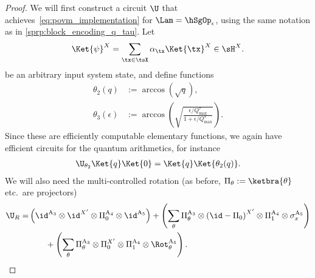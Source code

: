\begin{proof}
  We will first construct a circuit $\U$ that achieves~\cref{eq:povm_implementation} for $\Lam=\hSgOp_\epsilon$, using the same notation as in \cref{sprp:block_encoding_q_tau}. Let
  \begin{equation}
    \label{eq:psi}
    \Ket{\psi}^X=\sum_{\tx\in\tsX}\alpha_{\tx}\Ket{\tx}^X\in\sH^X.
  \end{equation}
  be an arbitrary input system state, and define functions
  \begin{align}
    \theta_2\left(q\right)&:=\arccos\left(\sqrt{q}\right),\\
    \theta_3\left(\epsilon\right)&:=\arccos\left(\sqrt{\frac{\epsilon/Q_{\max}^{\tau}}{1+\epsilon/Q_{\max}^{\tau}}}\right).
  \end{align}
  Since these are efficiently computable elementary functions, we again have efficient circuits for the quantum arithmetics, for instance
  \begin{align}
    \label{eq:U_theta_2}
    \U_{\theta_2}\Ket{q}\Ket{0} = \Ket{q}\Ket{\theta_2(q)}.
  \end{align}
  We will also need the multi-controlled rotation (as before, $\Pi_\theta:=\ketbra{\theta}$ etc.\ are projectors)
  \begin{align}
    \label{eq:controlled_rotation_sigma_lambda}
    \U_R=&\left(\id^{\text{A}_3}\otimes\id^{X'}\otimes\Pi_0^{\text{A}_4}\otimes\id^{\text{A}_5}\right)   +  
        \left(\sum_{\theta}\Pi_{\theta}^{\text{A}_3}\otimes\left(\id-\Pi_0\right)^{X'}\otimes\Pi_{1}^{\text{A}_4}\otimes \sigma_x^{\text{A}_5}\right)\nonumber\\
        &\qquad+\left(\sum_{\theta}\Pi_{\theta}^{\text{A}_3}\otimes\Pi_0^{X'}\otimes\Pi_{1}^{\text{A}_4}\otimes \Rot_\theta^{\text{A}_5}\right).
  \end{align}


\end{proof}
